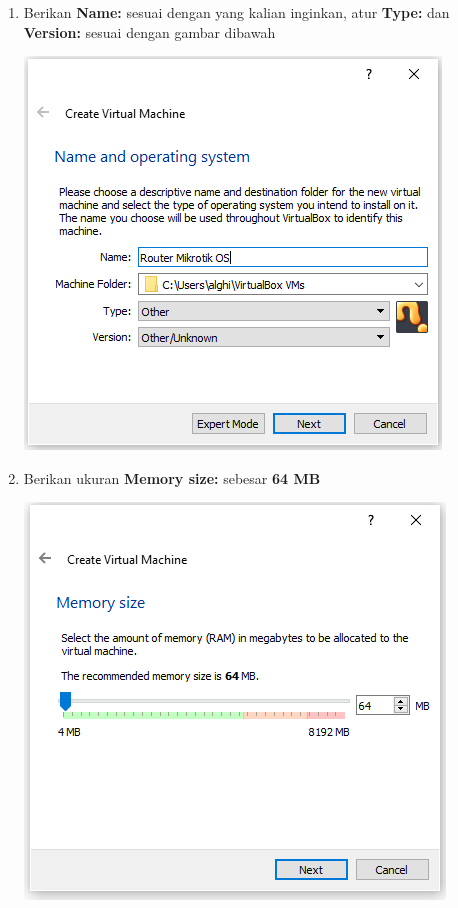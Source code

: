 \documentclass{article}
\begin{document}
\begin{flushleft}
\begin{enumerate}
        	\item Berikan \textbf{Name:} sesuai dengan yang kalian inginkan, atur \textbf{Type:} dan \textbf{Version:} sesuai dengan gambar dibawah
        		\begin{center}
        			\includegraphics[scale=0.6]{(2)}
        		\end{center}
        	
        	\item Berikan ukuran \textbf{Memory size:} sebesar \textbf{64 MB}
        		\begin{center}
        			\includegraphics[scale=0.6]{(3)}
				\end{center}
				

\end{enumerate}
\end{flushleft}
\end{document}

